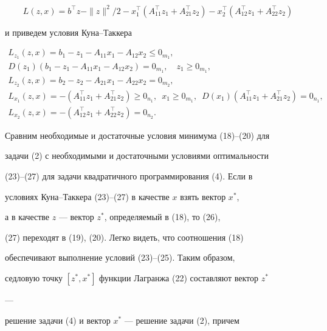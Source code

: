 \begin{pf}
\begin{equation}
L(z,x)=b^\top z-\|z\|^2/2-x^\top_1(A^\top_{11}z_1+


A^\top_{21}z_2)-x^\top_2(A^\top_{12}z_1+A^\top_{22}z_2)


\end{equation}


и приведем условия Куна--Таккера


\begin{gather}


L_{z_1}(z,x)=b_1-z_1-A_{11}x_1-A_{12}x_2\le0_{m_1},\\


%


D(z_1)(b_1-z_1-A_{11}x_1-A_{12}x_2)=0_{m_1},\quad z_1\ge0_{m_1},\\


%


L_{z_2}(z,x)=b_2-z_2-A_{21}x_1-A_{22}x_2=0_{m_2},\\


%


L_{x_1}(z,x)=-(A^\top_{11}z_1+A^\top_{21}z_2)\ge0_{n_1},


\ \; x_1\ge0_{m_1},\ \; D(x_1)(A^\top_{11}z_1+


A^\top_{21}z_2)=0_{n_1},\\


%


L_{x_2}(z,x)=-(A^\top_{12}z_1+A^\top_{22}z_2)=0_{n_2}.


\end{gather}





Сравним необходимые и достаточные условия минимума (18)--(20) для


задачи (2) с необходимыми и достаточными условиями оптимальности


(23)--(27) для задачи квадратичного программирования (4). Если в


условиях Куна--Таккера (23)--(27) в качестве $x$ взять вектор $x^*$,


а в качестве $z$ --- вектор $z^*$, определяемый в (18), то (26),


(27) переходят в (19), (20). Легко видеть, что соотношения (18)


обеспечивают выполнение условий (23)--(25). Таким образом,


седловую точку $[z^*,x^*]$ функции Лагранжа (22) составляют вектор $z^*$ 


---


решение задачи (4) и вектор $x^*$ --- решение задачи (2), причем



\end{pf}
